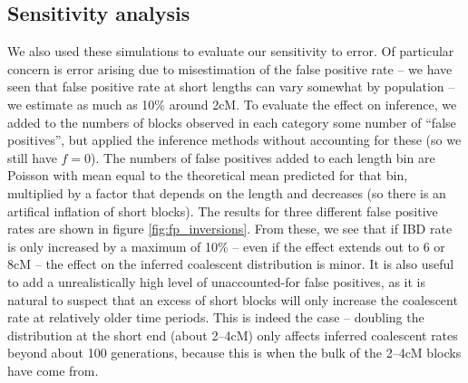 \documentclass{article}
\begin{document}
\subsection{Sensitivity analysis}

We also used these simulations to evaluate our sensitivity to error.
Of particular concern is error arising due to misestimation of the false positive rate --
we have seen that false positive rate at short lengths can vary somewhat by population -- 
we estimate as much as 10\% around 2cM.
To evaluate the effect on inference, we added to the numbers of blocks observed in each category
some number of ``false positives'', but applied the inference methods without accounting for these (so we still have $f=0$).
The numbers of false positives added to each length bin are Poisson with mean equal to the theoretical mean predicted for that bin,
multiplied by a factor that depends on the length and decreases (so there is an artifical inflation of short blocks).
The results for three different false positive rates are shown in figure \ref{fig:fp_inversions}.
From these, we see that if IBD rate is only increased by a maximum of 10\% 
-- even if the effect extends out to 6 or 8cM --
the effect on the inferred coalescent distribution is minor.
It is also useful to add a unrealistically high level of unaccounted-for false positives,
as it is natural to suspect that an excess of short blocks will only increase the coalescent rate at relatively older time periods.
This is indeed the case -- doubling the distribution at the short end (about 2--4cM)
only affects inferred coalescent rates beyond about 100 generations,
because this is when the bulk of the 2--4cM blocks have come from.
\end{document}
